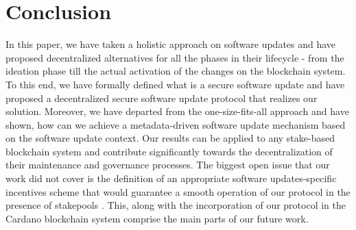 \section{Conclusion}
In this paper, we have taken a holistic approach on software updates and have proposed decentralized alternatives for all the phases in their lifecycle - from the ideation phase till the actual activation of the changes on the blockchain system. To this end, we have formally defined what is a secure software update and have proposed a decentralized secure software update protocol that realizes our solution. Moreover, we have departed from the one-size-fits-all approach and have shown, how can we achieve a metadata-driven software update mechanism based on the software update context. Our results can be applied to any stake-based blockchain system and contribute significantly towards the decentralization of their maintenance and governance processes. The biggest open issue that our work did not cover is the definition of an appropriate software updates-specific incentives scheme that would guarantee a smooth operation of our protocol in the presence of stakepools \cite{stakepools}. This, along with the incorporation of our protocol in the Cardano blockchain system \cite{cardano} comprise the main parts of our future work.
